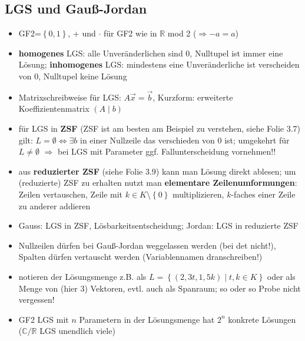 \documentclass[10pt,a4paper]{article}
\begin{document}
\subsection{LGS und Gauß-Jordan}
\begin{itemize}
\item GF2=$\left\lbrace 0,1\right\rbrace$, + und $\cdot$ für GF2 wie in $\mathbb{R}$ mod 2 ($\Rightarrow -a=a$)
\item \textbf{homogenes} LGS: alle Unveränderlichen sind 0, Nulltupel ist immer eine Lösung; \textbf{inhomogenes} LGS: mindestens eine Unveränderliche ist verscheiden von 0, Nulltupel keine Lösung  
\item Matrixschreibweise für LGS: $A\overrightarrow{x}=\overrightarrow{b}$, Kurzform: erweiterte Koeffizientenmatrix $(A \mid b)$
\item für LGS in \textbf{ZSF} (ZSF ist am besten am Beispiel zu verstehen, siehe Folie 3.7) gilt: $L=\emptyset \Leftrightarrow \exists b$ in einer Nullzeile das verschieden von 0 ist; umgekehrt für $L\neq \emptyset$ $\Rightarrow$ bei LGS mit Parameter ggf. Fallunterscheidung vornehmen!!
\item aus \textbf{reduzierter ZSF} (siehe Folie 3.9) kann man Lösung direkt ablesen; um (reduzierte) ZSF zu erhalten nutzt man \textbf{elementare Zeilenumformungen}: Zeilen vertauschen, Zeile mit $k\in K\setminus \left\lbrace 0\right\rbrace$ multiplizieren, $k$-faches einer Zeile zu anderer addieren
\item Gauss: LGS in ZSF, Lösbarkeitsentscheidung; Jordan: LGS in reduzierte ZSF
\item Nullzeilen dürfen bei Gauß-Jordan weggelassen werden (bei det nicht!), Spalten dürfen vertauscht werden (Variablennamen dranschreiben!)
\item notieren der Lösungsmenge z.B. als $L=\left\lbrace (2,3t,1,5k)\mid t,k \in K \right\rbrace$ oder als Menge von (hier 3) Vektoren, evtl. auch als Spanraum; so oder so Probe nicht vergessen!
\item GF2 LGS mit $n$ Parametern in der Lösungsmenge hat $2^{n}$ konkrete Lösungen ($\mathbb{C}/\mathbb{R}$ LGS unendlich viele)
\end{itemize}
\end{document}
